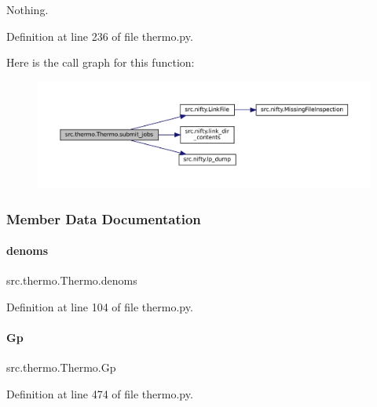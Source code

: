 Nothing. 

Definition at line 236 of file thermo.\+py.

Here is the call graph for this function\+:
\nopagebreak
\begin{figure}[H]
\begin{center}
\leavevmode
\includegraphics[width=350pt]{classsrc_1_1thermo_1_1Thermo_a9f614671342b1e8cdd55ce4c8b153242_cgraph}
\end{center}
\end{figure}


\subsubsection{Member Data Documentation}
\mbox{\label{classsrc_1_1thermo_1_1Thermo_a52da57ea1927e6d0b9d32d8a65f619a3}} 
\paragraph{\texorpdfstring{denoms}{denoms}}
{\footnotesize\ttfamily src.\+thermo.\+Thermo.\+denoms}



Definition at line 104 of file thermo.\+py.

\mbox{\label{classsrc_1_1thermo_1_1Thermo_a84596cc2780296226be18d9df3d28c65}} 
\paragraph{\texorpdfstring{Gp}{Gp}}
{\footnotesize\ttfamily src.\+thermo.\+Thermo.\+Gp}



Definition at line 474 of file thermo.\+py.


